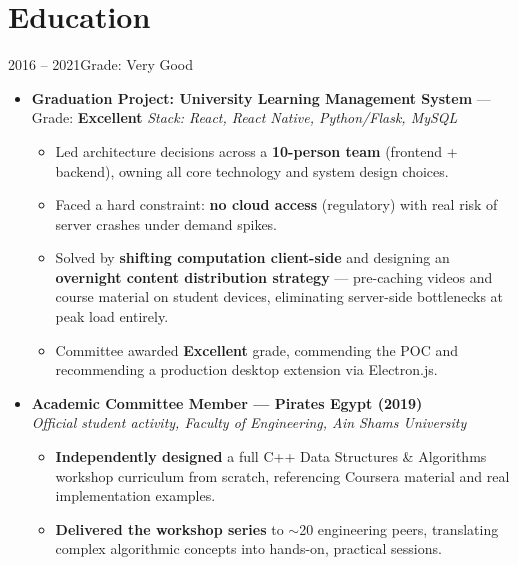 \newpage
\section{Education}

\begin{minipage}{\textwidth}
%
         {2016 -- 2021}{Grade: Very Good}

\begin{itemize}

  \item \textbf{Graduation Project: University Learning Management System} ---
        Grade: \textbf{Excellent} \hfill \textit{Stack: React, React Native, Python/Flask, MySQL}
        \begin{itemize}
          \item Led architecture decisions across a \textbf{10-person team} (frontend + backend),
                owning all core technology and system design choices.
          \item Faced a hard constraint: \textbf{no cloud access} (regulatory) with real risk of
                server crashes under demand spikes.
          \item Solved by \textbf{shifting computation client-side} and designing an
                \textbf{overnight content distribution strategy} --- pre-caching videos and
                course material on student devices, eliminating server-side bottlenecks
                at peak load entirely.
          \item Committee awarded \textbf{Excellent} grade, commending the POC and recommending
                a production desktop extension via Electron.js.
        \end{itemize}

  \item \textbf{Academic Committee Member --- Pirates Egypt (2019)} \\
        \textit{Official student activity, Faculty of Engineering, Ain Shams University}
        \begin{itemize}
          \item \textbf{Independently designed} a full C++ Data Structures \& Algorithms
                workshop curriculum from scratch, referencing Coursera material and
                real implementation examples.
          \item \textbf{Delivered the workshop series} to $\sim$20 engineering peers,
                translating complex algorithmic concepts into hands-on, practical sessions.
        \end{itemize}

\end{itemize}
\end{minipage}